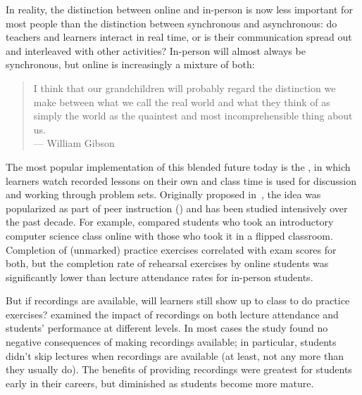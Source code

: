 In reality,
the distinction between online and in-person is now less important for most people
than the distinction between synchronous and asynchronous:
do teachers and learners interact in real time,
or is their communication spread out and interleaved with other activities?
In-person will almost always be synchronous,
but online is increasingly a mixture of both:

\begin{quote}

  I think that our grandchildren will probably regard the distinction we make
  between what we call the real world and what they think of as simply the world
  as the quaintest and most incomprehensible thing about us. \\
  --- William Gibson

\end{quote}

The most popular implementation of this blended future today
is the ,
in which learners watch recorded lessons on their own
and class time is used for discussion and working through problem sets.
Originally proposed in~\cite{King1993},
the idea was popularized as part of peer instruction ()
and has been studied intensively over the past decade.
For example,
\cite{Camp2016} compared students who took an introductory computer science class online
with those who took it in a flipped classroom.
Completion of (unmarked) practice exercises correlated with exam scores for both,
but the completion rate of rehearsal exercises by online students
was significantly lower than lecture attendance rates for in-person students.

But if recordings are available,
will learners still show up to class to do practice exercises?
\cite{Nord2017} examined the impact of recordings on both lecture attendance
and students' performance at different levels.
In most cases the study found no negative consequences of making recordings available;
in particular,
students didn't skip lectures when recordings are available
(at least, not any more than they usually do).
The benefits of providing recordings were greatest for students early in their careers,
but diminished as students become more mature.

